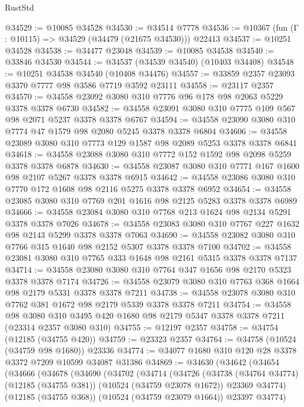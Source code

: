 \begin{lexlean}{RustStd}
\begin{coremodule}
@34529 := @10085 @34528
@34530 := @34514 @7778
@34536 := @10367 (fun (Γ : @10115) => @34529 (@34479 (@21675 @34530))) @22413
@34537 := @10251 @34528
@34538 := @34477 @23048
@34539 := @10085 @34538
@34540 := @33846 @34530
@34544 := @34537 (@34539 @34540) (@10403 @34408)
@34548 := @10251 @34538 @34540 (@10408 @34476)
@34557 := @33859 @2357 @23093 @3370 @7777 @98 @3586 @7719 @3592 @23111
@34558 := @23117 @2357
@34570 := @34558 @23092 @3080 @310 @7776 @96 @178 @98 @2063 @5229 @3378 @3378 @6730
@34582 := @34558 @23091 @3080 @310 @7775 @109 @567 @98 @2071 @5237 @3378 @3378 @6767
@34594 := @34558 @23090 @3080 @310 @7774 @47 @1579 @98 @2080 @5245 @3378 @3378 @6804
@34606 := @34558 @23089 @3080 @310 @7773 @129 @1587 @98 @2089 @5253 @3378 @3378 @6841
@34618 := @34558 @23088 @3080 @310 @7772 @152 @1592 @98 @2098 @5259 @3378 @3378 @6878
@34630 := @34558 @23087 @3080 @310 @7771 @167 @1600 @98 @2107 @5267 @3378 @3378 @6915
@34642 := @34558 @23086 @3080 @310 @7770 @172 @1608 @98 @2116 @5275 @3378 @3378 @6952
@34654 := @34558 @23085 @3080 @310 @7769 @201 @1616 @98 @2125 @5283 @3378 @3378 @6989
@34666 := @34558 @23084 @3080 @310 @7768 @213 @1624 @98 @2134 @5291 @3378 @3378 @7026
@34678 := @34558 @23083 @3080 @310 @7767 @227 @1632 @98 @2143 @5299 @3378 @3378 @7063
@34690 := @34558 @23082 @3080 @310 @7766 @315 @1640 @98 @2152 @5307 @3378 @3378 @7100
@34702 := @34558 @23081 @3080 @310 @7765 @333 @1648 @98 @2161 @5315 @3378 @3378 @7137
@34714 := @34558 @23080 @3080 @310 @7764 @347 @1656 @98 @2170 @5323 @3378 @3378 @7174
@34726 := @34558 @23079 @3080 @310 @7763 @368 @1664 @98 @2179 @5331 @3378 @3378 @7211
@34738 := @34558 @23078 @3080 @310 @7762 @381 @1672 @98 @2179 @5339 @3378 @3378 @7211
@34754 := @34558
    @98
    @3080
    @310
    @3495
    @420
    @1680
    @98
    @2179
    @5347
    @3378
    @3378
    @7211
    (@23314 @2357 @3080 @310)
@34755 := @12197 @2357
@34758 := @34754 (@12185 (@34755 @420))
@34759 := @23323 @2357
@34764 := @34758 (@10524 (@34759 @98 @1680)) @23336
@34774 := @34077 @1680 @310 @120 @28 @3378 @3372 @7209 @10599 @34087 @31386
@34869 := @34630
    (@34642
      (@34654
        (@34666
          (@34678
            (@34690
              (@34702
                (@34714
                  (@34726
                    (@34738
                      (@34764 @34774)
                      (@12185 (@34755 @381))
                      (@10524 (@34759 @23078 @1672))
                      @23369
                      @34774)
                    (@12185 (@34755 @368))
                    (@10524 (@34759 @23079 @1664))
                    @23397
                    @34774)

\end{coremodule}
\end{lexlean}
